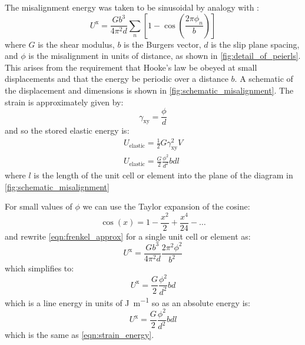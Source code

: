 The misalignment energy was taken to be sinusoidal by analogy with \citet{Frenkel1926}:
\begin{equation}
U^{\text{x}} = \frac{Gb^3}{4\pi^2 d} \sum_n \left[ 1 - \cos \left(\frac{2\pi \phi_n}{b} \right)\right] \label{eqn:frenkel_approx}
\end{equation}
where $G$ is the shear modulus, $b$ is the Burgers vector, $d$ is the slip plane spacing, and $\phi$ is the misalignment in units of distance, as shown in \autoref{fig:detail_of_peierls}. This arises from the requirement that Hooke's law be obeyed at small displacements and that the energy be periodic over a distance $b$. A schematic of the displacement and dimensions is shown in \autoref{fig:schematic_misalignment}.
The strain is approximately given by:
\begin{equation}
\gamma_{\text{xy}} = \frac{\phi}{d}
\end{equation}
and so the stored elastic energy is:
\begin{align}
U_{\text{elastic}} = \frac{1}{2} G \gamma_{\text{xy}}^2 V \nonumber\\
U_{\text{elastic}} = \frac{G}{2} \frac{\phi^2}{d^2} b d l \label{eqn:strain_energy}
\end{align}
where $l$ is the length of the unit cell or element into the plane of the diagram in \autoref{fig:schematic_misalignment}

For small values of $\phi$ we can use the Taylor expansion of the cosine:
\begin{equation}
\cos(x) = 1 - \frac{x^2}{2} + \frac{x^4}{24} - \dots
\end{equation}
and rewrite \autoref{eqn:frenkel_approx} for a single unit cell or element as:
\begin{equation}
U^{\text{x}} = \frac{Gb^3}{4\pi^2 d} \frac{2 \pi^2 \phi^2}{b^2}
\end{equation}
which simplifies to:
\begin{equation}
U^{\text{x}} = \frac{G}{2} \frac{\phi^2}{d^2} b d
\end{equation}
which is a line energy in units of \si{\joule\per\meter} so as an absolute energy is:
\begin{equation}
U^{\text{x}} = \frac{G}{2} \frac{\phi^2}{d^2} b d l
\end{equation}
which is the same as \autoref{eqn:strain_energy}.









